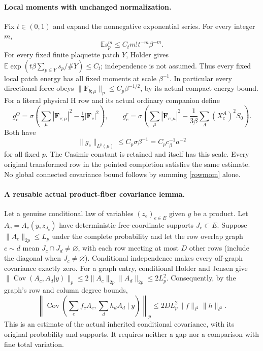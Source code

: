 \documentclass[11pt]{article}
\newcommand{\E}{\mathbb E}
\newcommand{\Cov}{\operatorname{Cov}}
\begin{document}
\paragraph{Local moments with unchanged normalization.}
Fix $t\in(0,1)$ and expand the nonnegative exponential series. For every integer $m$,
\[
 \E s_p^m\le C_t m!t^{-m}\beta^{-m}.
\]
For every fixed finite plaquette patch $Y$, Holder gives
$\E\exp(t\beta\sum_{p\in Y}s_p/\#Y)\le C_t$; independence is not assumed.
Thus every fixed local patch energy has all fixed moments at scale $\beta^{-1}$.
In particular every directional force obeys
$\|\mathbf F_{b;\mu}\|_p\le C_p\beta^{-1/2}$, by its actual compact energy bound.
For a literal physical H row and its actual ordinary companion define
\[
 g_c^O=\sigma\left(\sum_\mu|\mathbf F_{c;\mu}|^2-\tfrac13|\mathbf F_c|^2\right),
 \qquad
 g_c^r=\sigma\left(\sum_\mu|\mathbf F_{c;\mu}|^2
            -\frac1{3\beta}\sum_A(X_c^A)^2S_0\right).
\]
Both have
\begin{equation}\label{rowmom}
 \|g_c\|_{L^p(\mu)}\le C_p\sigma\beta^{-1}=C_pc_\beta^{-1}a^{-2}
\end{equation}
for all fixed $p$. The Casimir constant is retained and itself has this scale.
Every original transformed row in the pointed completion satisfies the same estimate.
No global connected covariance bound follows by summing \eqref{rowmom} alone.

\paragraph{A reusable actual product-fiber covariance lemma.}
Let a genuine conditional law of variables $(z_e)_{e\in E}$ given $y$ be a product.
Let $A_c=A_c(y,z_{J_c})$ have deterministic free-coordinate supports $J_c\subset E$.
Suppose $\|A_c\|_{2p}\le L_p$ under the complete probability and let the row overlap
graph $c\sim d$ mean $J_c\cap J_d\ne\varnothing$, with each row meeting at most $D$
other rows (include the diagonal when $J_c\ne\varnothing$).
Conditional independence makes every off-graph covariance exactly zero. For a graph entry,
conditional Holder and Jensen give
$\|\Cov(A_c,A_d|y)\|_p\le2\|A_c\|_{2p}\|A_d\|_{2p}\le2L_p^2$.
Consequently, by the graph's row and column degree bounds,
\begin{equation}\label{fiberlemma}
 \left\|\Cov\left(\sum_cf_cA_c,\sum_dh_dA_d\mid y\right)\right\|_p
 \le2D L_p^2\|f\|_{\ell^2}\|h\|_{\ell^2}.
\end{equation}
This is an estimate of the actual inherited conditional covariance, with its original
probability and supports. It requires neither a gap nor a comparison with fine total variation.
\end{document}

